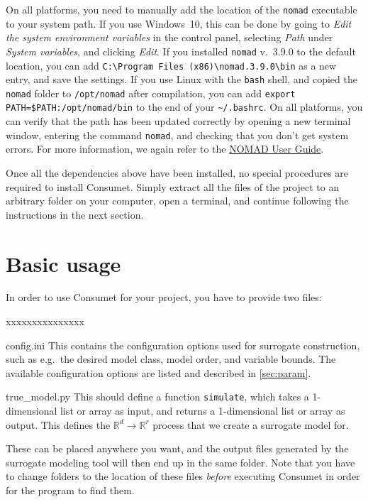 \documentclass[a4paper,bibliography=numbered]{scrartcl}
\begin{document}
On all platforms, you need to manually add the location of the \texttt{nomad} executable to your system path.
If you use Windows~10, this can be done by going to \emph{Edit the system environment variables} in the control panel, selecting \emph{Path} under \emph{System variables}, and clicking \emph{Edit}.
If you installed \texttt{nomad} v.~3.9.0 to the default location, you can add \verb|C:\Program Files (x86)|\verb|\nomad.3.9.0\bin| as a new entry, and save the settings.
If you use Linux with the \texttt{bash} shell, and copied the \texttt{nomad} folder to \texttt{/opt}\texttt{/nomad} after compilation, you can add \texttt{export} \texttt{PATH=\$PATH:/opt}\texttt{/nomad/bin} to the end of your \texttt{\textasciitilde/.bashrc}.
On all platforms, you can verify that the path has been updated correctly by opening a new terminal window, entering the command \texttt{nomad}, and checking that you don't get system errors.
For more information, we again refer to the \href{https://sourceforge.net/projects/nomad-bb-opt/files/user_guide.pdf/download}{NOMAD User Guide}.

Once all the dependencies above have been installed, no special procedures are required to install Consumet.
Simply extract all the files of the project to an arbitrary folder on your computer, open a terminal, and continue following the instructions in the next section.



\section{Basic usage}\label{sec:basic}
In order to use Consumet for your project, you have to provide two files: 
\begin{labeling}{xxxxxxxxxxxxxxx}
	\item[config.ini]
		This contains the configuration options used for surrogate construction, such as e.g.\ the desired model class, model order, and variable bounds.
		The available configuration options are listed and described in \cref{sec:param}.
	\item[true\_model.py]
		This should define a function \texttt{simulate}, which takes a 1-dimensional list or array as input, and returns a 1-dimensional list or array as output.
		This defines the $\mathbb{R}^d \rightarrow \mathbb{R}^r$ process that we create a surrogate model for.
\end{labeling}
These can be placed anywhere you want, and the output files generated by the surrogate modeling tool will then end up in the same folder.
Note that you have to change folders to the location of these files \emph{before} executing Consumet in order for the program to find them.
\end{document}
